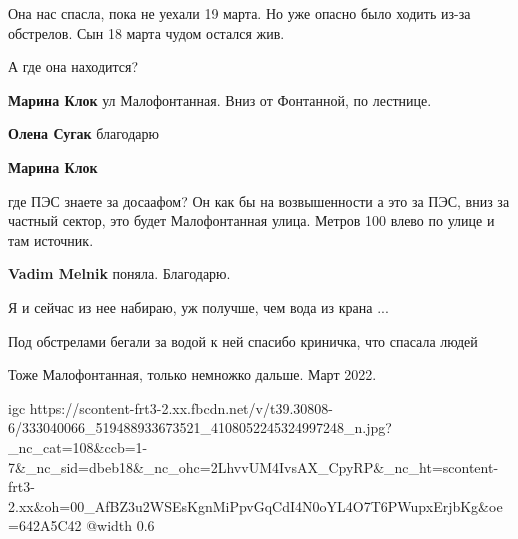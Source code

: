  
 
 
 
 

\qqSecCmt


Она нас спасла, пока не уехали 19 марта. Но уже опасно было ходить из-за
обстрелов. Сын 18 марта чудом остался жив.


А где она находится?

\begin{itemize} %
\textbf{Марина Клок} ул Малофонтанная. Вниз от Фонтанной, по лестнице.

\textbf{Олена Сугак} благодарю

\textbf{Марина Клок} 

где ПЭС знаете за досаафом? Он как бы на возвышенности а это за ПЭС, вниз за
частный сектор, это будет Малофонтанная улица. Метров 100 влево по улице и там
источник.

\textbf{Vadim Melnik} поняла. Благодарю.
\end{itemize} %


Я и сейчас из нее набираю, уж получше, чем вода из крана ...


Под обстрелами бегали за водой к ней спасибо криничка, что спасала людей


Тоже Малофонтанная, только немножко дальше. Март 2022.

\ifcmt
  igc https://scontent-frt3-2.xx.fbcdn.net/v/t39.30808-6/333040066_519488933673521_4108052245324997248_n.jpg?_nc_cat=108&ccb=1-7&_nc_sid=dbeb18&_nc_ohc=2LhvvUM4IvsAX_CpyRP&_nc_ht=scontent-frt3-2.xx&oh=00_AfBZ3u2WSEsKgnMiPpvGqCdI4N0oYL4O7T6PWupxErjbKg&oe=642A5C42
	@width 0.6
\fi

